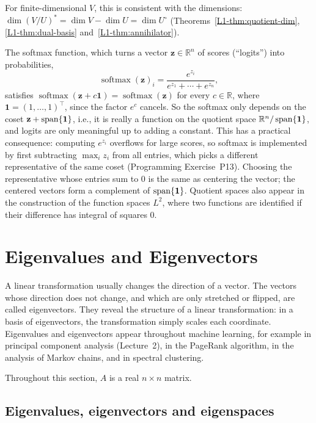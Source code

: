 For finite-dimensional $V$, this is consistent with the dimensions: $\dim (V/U)^* = \dim V - \dim U = \dim U^\circ$ (Theorems~\ref{L1-thm:quotient-dim}, \ref{L1-thm:dual-basis} and~\ref{L1-thm:annihilator}).

\begin{remark}
    The softmax function, which turns a vector $\mathbf{z} \in \mathbb{R}^n$ of scores (``logits'') into probabilities,
    \[\operatorname{softmax}(\mathbf{z})_i = \frac{e^{z_i}}{e^{z_1} + \cdots + e^{z_n}},\]
    satisfies $\operatorname{softmax}(\mathbf{z} + c\mathbf{1}) = \operatorname{softmax}(\mathbf{z})$ for every $c \in \mathbb{R}$, where $\mathbf{1} = (1, \ldots, 1)^\top$, since the factor $e^c$ cancels. So the softmax only depends on the coset $\mathbf{z} + \operatorname{span}\{\mathbf{1}\}$, i.e., it is really a function on the quotient space $\mathbb{R}^n/\operatorname{span}\{\mathbf{1}\}$, and logits are only meaningful up to adding a constant. This has a practical consequence: computing $e^{z_i}$ overflows for large scores, so softmax is implemented by first subtracting $\max_i z_i$ from all entries, which picks a different representative of the same coset (Programming Exercise~P13). Choosing the representative whose entries sum to $0$ is the same as centering the vector; the centered vectors form a complement of $\operatorname{span}\{\mathbf{1}\}$. Quotient spaces also appear in the construction of the function spaces $L^2$, where two functions are identified if their difference has integral of squares $0$.
\end{remark}

\section{Eigenvalues and Eigenvectors}\label{L1-sec:eigen}

A linear transformation usually changes the direction of a vector. The vectors whose direction does not change, and which are only stretched or flipped, are called eigenvectors. They reveal the structure of a linear transformation: in a basis of eigenvectors, the transformation simply scales each coordinate. Eigenvalues and eigenvectors appear throughout machine learning, for example in principal component analysis (Lecture~2), in the PageRank algorithm, in the analysis of Markov chains, and in spectral clustering.

Throughout this section, $A$ is a real $n \times n$ matrix.

\subsection{Eigenvalues, eigenvectors and eigenspaces}

